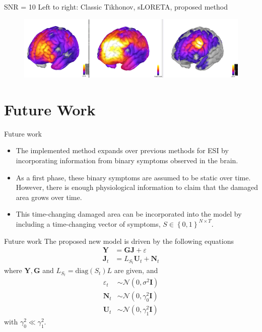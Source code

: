 \documentclass[progressbar=head]{beamer}
\newcommand{\set}[1]{ \left\{ #1 \right\} }
\newcommand{\ppar}[1]{ \left( #1 \right) }
\newcommand{\J}{\mathbf{J}}
\newcommand{\Y}{\mathbf{Y}}
\newcommand{\G}{\mathbf{G}}
\newcommand{\U}{\mathbf{U}}
\newcommand{\N}{\mathbf{N}}
\newcommand{\id}{\mathbf{I}}
\newcommand{\norm}{\mathcal{N}}
\begin{document}
\begin{frame}{SNR = 10}
Left to right: Classic Tikhonov, sLORETA, proposed method
\begin{figure}
\centering
\includegraphics[width=1\linewidth]{./img_oldbeamer/comparison1}
\end{figure}
\end{frame}


{
\section{Future Work}
}

\begin{frame}{Future work}
\begin{itemize}
    \item The implemented method expands over previous methods for ESI by incorporating information from binary symptoms observed in the brain.
    \item As a first phase, these binary symptoms are assumed to be static over time. However, there is enough physiological information to claim that the damaged area grows over time.
    \item This time-changing damaged area can be incorporated into the model by including a time-changing vector of symptoms, ${S\in \set{0,1}^{N\times T}}$.
\end{itemize}
\end{frame}

\begin{frame}{Future work}
The proposed new model is driven by the following equations
\begin{align}
    \Y &= \G \J + \varepsilon \\
    \J_t &=  L_{S_t} \U_t + \N_t
\end{align}
where $\Y, \G$ and $L_{S_t} = \text{diag}\ppar{S_t} L$ are given, and
\begin{align}
    \varepsilon_t &\sim  \norm\ppar{0, \sigma^2 \id } \\
    \N_t &\sim  
    \norm\ppar{0, \gamma_0^2 \id } \\
    \U_t &\sim  
    \norm\ppar{0, \gamma_1^2 \id } 
\end{align}
with $\gamma_0^2 \ll \gamma_1^2$.
\end{frame}
\end{document}

